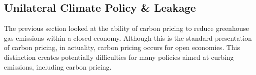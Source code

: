 


\subsection{Unilateral Climate Policy \& Leakage}


The previous section looked at the ability of carbon pricing to reduce greenhouse gas emissions within a closed economy. Although this is the standard presentation of carbon pricing, in actuality, carbon pricing occurs for open economies. This distinction creates potentially difficulties for many policies aimed at curbing emissions, including carbon pricing. 

